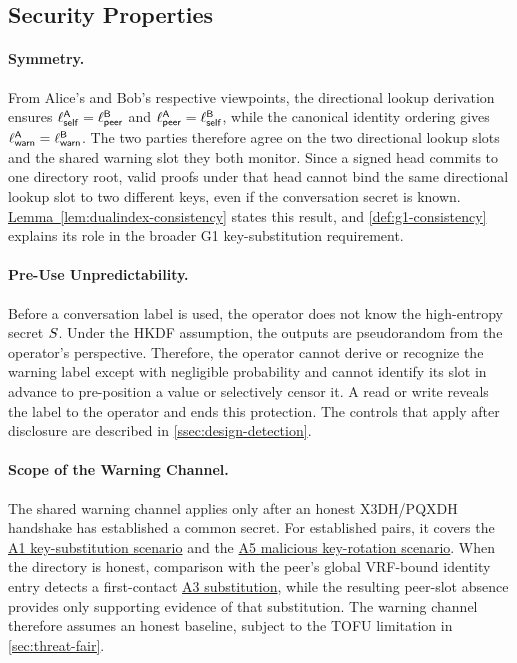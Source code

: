 \subsection{Security Properties}\label{ssec:design-properties}

\paragraph{Symmetry.} From Alice's and Bob's respective viewpoints, the directional lookup
derivation ensures $\ell^{\mathsf{A}}_{\mathsf{self}} = \ell^{\mathsf{B}}_{\mathsf{peer}}$ and
$\ell^{\mathsf{A}}_{\mathsf{peer}} = \ell^{\mathsf{B}}_{\mathsf{self}}$, while the canonical identity ordering gives
$\ell^{\mathsf{A}}_{\mathsf{warn}} = \ell^{\mathsf{B}}_{\mathsf{warn}}$. The two parties therefore agree on the two
directional lookup slots and the shared warning slot they both monitor. Since a signed head
commits to one directory root, valid proofs under that head cannot bind the same directional lookup
slot to two different keys, even if the conversation secret is known.
\hyperref[lem:dualindex-consistency]{Lemma~\ref*{lem:dualindex-consistency}} states this result, and \cref{def:g1-consistency} explains its role
in the broader G1 key-substitution requirement.

\paragraph{Pre-Use Unpredictability.} Before a conversation label is used, the operator does not
know the high-entropy secret $S$. Under the HKDF assumption, the outputs are
pseudorandom from the operator's perspective. Therefore, the operator cannot derive or recognize the
warning label except with negligible probability and cannot identify its slot in advance to
pre-position a value or selectively censor it. A read or write reveals the label to the operator and
ends this protection. The controls that apply after disclosure are described in
\cref{ssec:design-detection}.

\paragraph{Scope of the Warning Channel.} The shared warning channel applies only after an honest
X3DH/PQXDH handshake has established a common secret. For established pairs, it covers the
\hyperref[sc:threat-a1]{A1 key-substitution scenario} and the
\hyperref[sc:threat-a5]{A5 malicious key-rotation scenario}. When the directory is honest,
comparison with the peer's global VRF-bound identity entry detects a first-contact
\hyperref[sc:threat-a3]{A3 substitution}, while the resulting peer-slot absence provides only
supporting evidence of that substitution. The warning channel therefore assumes an honest baseline,
subject to the TOFU limitation in \cref{sec:threat-fair}.

